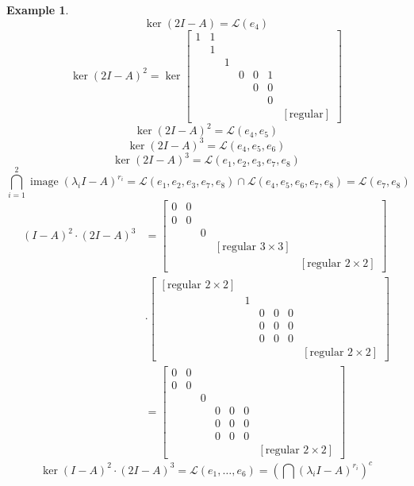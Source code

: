 \documentclass{article}
\newtheorem{example}{Example}  \numberwithin{example}{section}
\DeclareMathOperator{\im}{image}
\begin{document}
\begin{example}
\[    \ker(2I - A) = \mathcal L(e_{4})
  \] \[
    \ker(2I - A)^2 = \ker\begin{bmatrix}
      1 & 1  &   &    &    &    &     \\   %
        & 1  &   &    &    &    &     \\   %
        &    & 1 &    &    &    &     \\
        &    &   & 0  & 0  & 1  &     \\
        &    &   &    & 0  & 0  &     \\
        &    &   &    &    & 0  &     \\
        &    &   &    &    &    & [\text{regular}]
    \end{bmatrix}
  \] \[
    \ker(2I - A)^2 = \mathcal L(e_4, e_5)
  \] \[
    \ker(2I - A)^3 = \mathcal L(e_4, e_5, e_6)
  \] \[
    \ker(2I - A)^3 = \mathcal L(e_1, e_2, e_3, e_7, e_8)
  \] \[
    \bigcap_{i=1}^2 \im(\lambda_i I - A)^{r_i} = \mathcal L(e_1, e_2, e_3, e_7, e_8) \cap \mathcal L(e_4, e_5, e_6, e_7, e_8) = \mathcal L(e_7, e_8)
  \]
  \begin{align*}
    (I - A)^2 \cdot (2I - A)^3 &= \begin{bmatrix}
      0 & 0 &   & & \\
      0 & 0 &   & & \\
        &   & 0 & & \\
        &   &   & [\text{regular } 3 \times 3] & \\
        &   &   &       & [\text{regular } 2 \times 2]
    \end{bmatrix} \\ &\cdot \begin{bmatrix}
      [\text{regular } 2 \times 2] & & & & & \\
        & 1 &   &   &   & \\
        &   & 0 & 0 & 0 & \\
        &   & 0 & 0 & 0 & \\
        &   & 0 & 0 & 0 & \\
        &   &   &   &   & [\text{regular } 2 \times 2]
    \end{bmatrix} \\ &= \begin{bmatrix}
      0 & 0 &   &   &   &   & \\
      0 & 0 &   &   &   &   & \\
        &   & 0 &   &   &   & \\
        &   &   & 0 & 0 & 0 & \\
        &   &   & 0 & 0 & 0 & \\
        &   &   & 0 & 0 & 0 & \\
        &   &   &   &   &   & [\text{regular } 2\times 2]
    \end{bmatrix}
  \end{align*} \[
    \ker{(I - A)^2 \cdot (2I - A)^3} = \mathcal L(e_1, \dots, e_6) = \left(\bigcap (\lambda_i I - A)^{r_i}\right)^c
  \]
\end{example}
\end{document}
